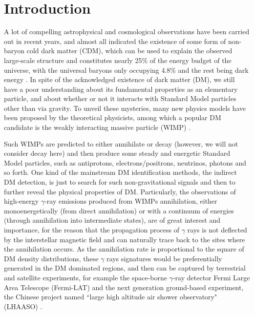 \documentclass[12pt,prd,showpacs,amsmath,amssymb,aps,floats,floatfix,nofootinbib]{revtex4-1}
\begin{document}
\section{Introduction}
A lot of compelling astrophysical and cosmological observations have been carried out in recent years, and almost all indicated the existence of some form of non-baryon cold dark matter (CDM), which can be used to explain the observed large-scale structure and constitutes nearly 25\% of the energy budget of the universe, with the universal baryons only occupying 4.8\% and the rest being dark energy \cite{Adam:2015rua}. In spite of the acknowledged existence of dark matter (DM), we still have a poor understanding about its fundamental properties as an elementary particle, and about whether or not it interacts with Standard Model particles other than via gravity. To unveil these mysteries, many new physics models have been proposed by the theoretical physicists, among which a popular DM candidate is the weakly interacting massive particle (WIMP) \cite{Jungman:1995df,Bergstrom:2000pn,Bertone:2004pz}. %

Such WIMPs are predicted to either annihilate or decay (however, we will not consider decay here) and then produce some steady and energetic Standard Model particles, such as antiprotons, electrons/positrons, neutrinos, photons and so forth. One kind of the mainstream DM identification methods, the indirect DM detection, is just to search for such non-gravitational signals
and then to further reveal the physical properties of DM. Particularly, the observations of high-energy $\gamma$-ray emissions produced from WIMPs annihilation, either monoenergetically (from direct annihilation) or with a continuum of energies (through annihilation into intermediate states), are of great interest and importance, for the reason that the propagation process of $\gamma$ rays is not deflected by the interstellar magnetic field and can naturally trace back to the sites where the annihilation occurs. As the annihilation rate is proportional to the square of DM density distributions, these $\gamma$ rays signatures would be preferentially generated in the DM dominated regions, and then can be captured by terrestrial and satellite experiments, for example the space-borne $\gamma$-ray detector Fermi Large Area Telescope (Fermi-LAT) and the next generation ground-based experiment, the Chinese project named ``large high altitude air shower observatory" (LHAASO) \cite{Cao:2010zz,Cao:2014rla}.
\end{document}
